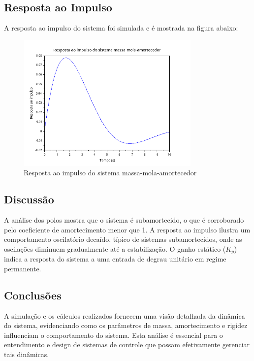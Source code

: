 \subsection{Resposta ao Impulso}
A resposta ao impulso do sistema foi simulada e é mostrada na figura abaixo:
\begin{figure}[H]
    \centering
    \includegraphics[width=0.8\textwidth]{3-atividade/assets/resposta-ao-impulso.png}
    \caption{Resposta ao impulso do sistema massa-mola-amortecedor}
\end{figure}

\subsection{Discussão}
A análise dos polos mostra que o sistema é subamortecido, o que é corroborado pelo coeficiente de amortecimento menor que 1. A resposta ao impulso ilustra um comportamento oscilatório decaído, típico de sistemas subamortecidos, onde as oscilações diminuem gradualmente até a estabilização. O ganho estático (\( K_p \)) indica a resposta do sistema a uma entrada de degrau unitário em regime permanente.

\subsection{Conclusões}
A simulação e os cálculos realizados fornecem uma visão detalhada da dinâmica do sistema, evidenciando como os parâmetros de massa, amortecimento e rigidez influenciam o comportamento do sistema. Esta análise é essencial para o entendimento e design de sistemas de controle que possam efetivamente gerenciar tais dinâmicas.
